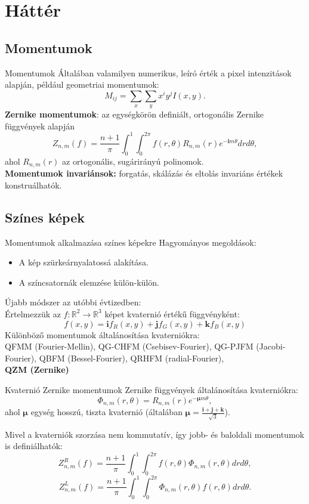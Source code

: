 \documentclass{beamer}
\newcommand{\R}{\mathbb{R}}
\newcommand{\qi}{\textbf{i}}
\newcommand{\qj}{\textbf{j}}
\newcommand{\qk}{\textbf{k}}
\newcommand{\qmu}{\boldsymbol{\mu}}
\def\R{{\mathbb R}}
\begin{document}
\section{Háttér}
\subsection{Momentumok}
\begin{frame}{Momentumok}
Általában valamilyen numerikus, leíró érték a pixel intenzitások alapján, 
például geometriai momentumok: $$M_{ij} = \sum_x\sum_y x^i y^j I(x,y).$$
\textbf{Zernike momentumok}: az egységkörön definiált, ortogonális Zernike függvények alapján
$$Z_{n,m}(f) = \frac{n+1}{\pi}\int_0^1\int_0^{2\pi}f(r,\theta)R_{n,m}(r)e^{-\qi m\theta} dr d\theta,$$ ahol $R_{n,m}(r)$ az ortogonális, sugárirányú polinomok.\\

\textbf{Momentumok invariánsok:} forgatás, skálázás és eltolás invariáns értékek konstruálhatók.
\end{frame}

\subsection{Színes képek}
\begin{frame}{Momentumok alkalmazása színes képekre}
Hagyományos megoldások:
\begin{itemize}
    \item A kép szürkeárnyalatossá alakítása.
    \item A színcsatornák elemzése külön-külön.
\end{itemize}
Újabb módszer az utóbbi évtizedben:\\
Értelmezzük az $f : \R^2 \rightarrow \R^3$ képet kvaternió értékű függvényként:
$$f(x,y) = \qi f_R(x,y) + \qj f_G(x,y) + \qk f_B(x,y)$$
Különböző momentumok általánosítása kvaterniókra:\\
QFMM (Fourier-Mellin), QG-CHFM (Csebisev-Fourier), QG-PJFM (Jacobi-Fourier), QBFM (Bessel-Fourier), QRHFM (radial-Fourier), \\
\textbf{QZM (Zernike)}
\end{frame}

\begin{frame}{Kvaternió Zernike momentumok}
\vskip 3mm
Zernike függvények általánosítása kvaterniókra: $$\Phi_{n,m}(r,\theta) = R_{n,m}(r)e^{-\qmu m \theta},$$ ahol $\qmu$ egység hosszú, tiszta kvaternió (általában $\qmu = \frac{\qi + \qj + \qk}{\sqrt{3}}$).

Mivel a kvaterniók szorzása nem kommutatív, így jobb- és baloldali momentumok is definiálhatók:
$$Z^R_{n,m}(f) = \frac{n+1}{\pi}\int_0^1\int_0^{2\pi}f(r,\theta)\Phi_{n,m}(r,\theta) dr d\theta,$$
$$Z^L_{n,m}(f) = \frac{n+1}{\pi}\int_0^1\int_0^{2\pi}\Phi_{n,m}(r,\theta)f(r,\theta) dr d\theta.$$

\end{frame}
\end{document}
